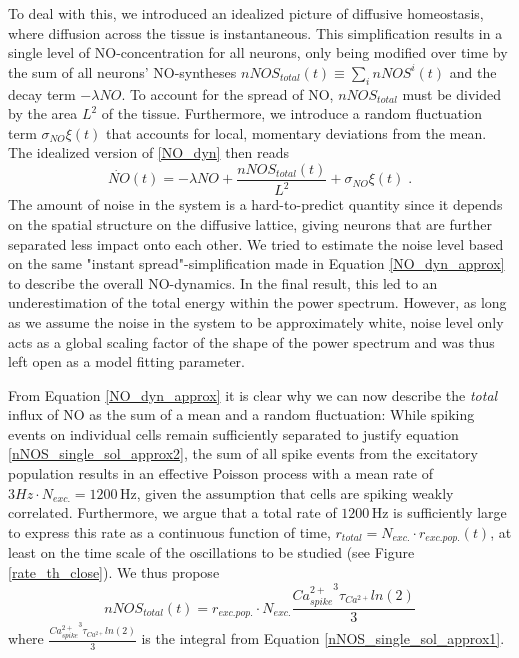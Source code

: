 \documentclass[10pt,a4paper]{article}
\begin{document}
To deal with this, we introduced an idealized picture of diffusive homeostasis, where diffusion across the tissue is instantaneous. This simplification results in a single level of NO-concentration for all neurons, only being modified over time by the sum of all neurons' NO-syntheses $nNOS_{total}(t) \equiv \sum_{i} nNOS^i(t)$ and the decay term $-\lambda NO$. To account for the spread of NO, $nNOS_{total}$ must be divided by the area $L^2$ of the tissue. Furthermore, we introduce a random fluctuation term $\sigma_{NO} \xi(t)$ that accounts for local, momentary deviations from the mean. The idealized version of \eqref{NO_dyn} then reads
\begin{equation}
\dot{NO}(t)=-\lambda NO + \frac{nNOS_{total}(t)}{L^2} + \sigma_{NO} \xi(t)\;.
\label{NO_dyn_approx}
\end{equation}
The amount of noise in the system is a hard-to-predict quantity since it depends on the spatial structure on the diffusive lattice, giving neurons that are further separated less impact onto each other. We tried to estimate the noise level based on the same "instant spread"-simplification made in Equation \eqref{NO_dyn_approx} to describe the overall NO-dynamics. In the final result, this led to an underestimation of the total energy within the power spectrum. However, as long as we assume the noise in the system to be approximately white, noise level only acts as a global scaling factor of the shape of the power spectrum and was thus left open as a model fitting parameter.

From Equation \eqref{NO_dyn_approx} it is clear why we can now describe the \emph{total} influx of NO as the sum of a mean and a random fluctuation: While spiking events on individual cells remain sufficiently separated to justify equation \eqref{nNOS_single_sol_approx2}, the sum of all spike events from the excitatory population results in an effective Poisson process with a mean rate of $3 Hz \cdot N_{exc.} = \mathrm{1200\,Hz}$, given the assumption that cells are spiking weakly correlated. Furthermore, we argue that a total rate of $\mathrm{1200\,Hz}$ is sufficiently large to express this rate as a continuous function of time, $r_{total} = N_{exc.}\cdot r_{exc.pop.}(t)$, at least on the time scale of the oscillations to be studied (see  Figure \ref{rate_th_close}). We thus propose
\begin{equation}
nNOS_{total}(t) = r_{exc.pop.}\cdot N_{exc.}\frac{{Ca^{2+}_{spike}}^3 \tau_{Ca^{2+}}ln(2)}{3}
\label{nNOS_total_dyn}
\end{equation} 
where $\frac{{Ca^{2+}_{spike}}^3 \tau_{Ca^{2+}}ln(2)}{3}$ is the integral from Equation \eqref{nNOS_single_sol_approx1}.
\end{document}
